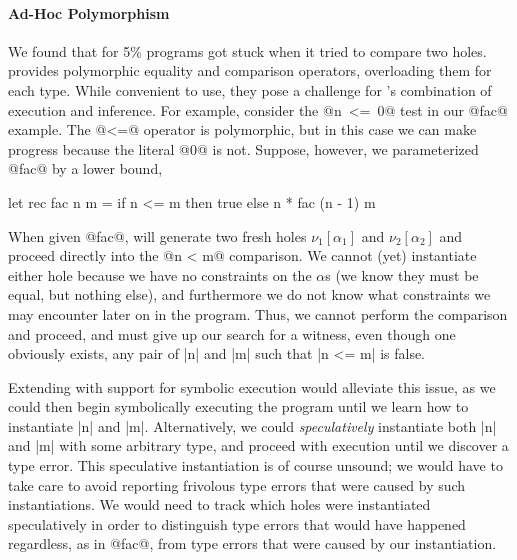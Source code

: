\paragraph{Ad-Hoc Polymorphism}
%
We found that for 5\% programs \toolname got stuck when it tried to
compare two holes.
%
\ocaml provides polymorphic equality and comparison operators,
overloading them for each type.
%
While convenient to use, they pose a challenge for \toolname's
combination of execution and inference.
%
For example, consider the \hbox{@n <= 0@} test in our @fac@ example.
%
The @<=@ operator is polymorphic, but in this case we can make progress because
the literal @0@ is not.
%
Suppose, however, we parameterized @fac@ by a lower bound, \eg
%
\begin{code}
  let rec fac n m =
    if n <= m then
      true
    else
      n * fac (n - 1) m
\end{code}
%
When given @fac@, \toolname will generate two fresh holes
$\nu_1[\alpha_1]$ and $\nu_2[\alpha_2]$ and proceed directly into the
@n < m@ comparison.
%
We cannot (yet) instantiate either hole because we have no constraints
on the $\alpha$s (we know they must be equal, but nothing else), and
furthermore we do not know what constraints we may encounter later on in
the program.
%
Thus, we cannot perform the comparison and proceed, and must give up our
search for a witness, even though one obviously exists, any pair of |n|
and |m| such that |n <= m| is false.

Extending \toolname with support for symbolic execution would alleviate
this issue, as we could then begin symbolically executing the program
until we learn how to instantiate |n| and |m|.
%
Alternatively, we could \emph{speculatively} instantiate both |n| and
|m| with some arbitrary type, and proceed with execution until we
discover a type error.
%
This speculative instantiation is of course unsound; we would have to
take care to avoid reporting frivolous type errors that were caused by
such instantiations.
%
We would need to track which holes were instantiated speculatively in
order to distinguish type errors that would have happened regardless, as
in @fac@, from type errors that were caused by our instantiation.

